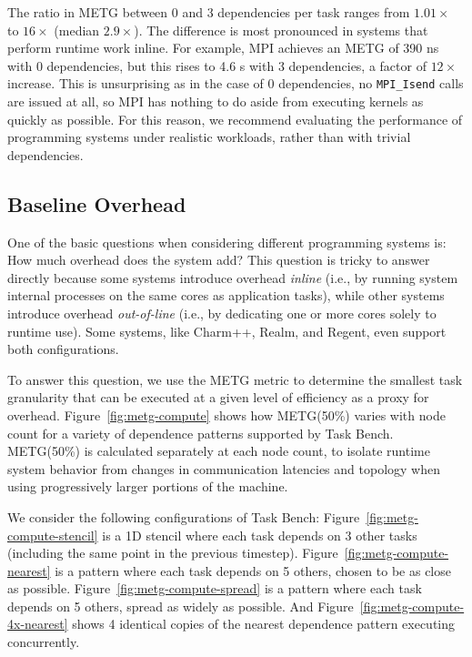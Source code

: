 

The ratio in METG between 0 and 3 dependencies per task ranges from
$1.01\times$ to $16\times$ (median $2.9\times$). The difference is most pronounced in systems that
perform runtime work inline. For example, MPI achieves an METG of 390
ns with 0 dependencies, but this rises to 4.6 \textmu{}s with 3 dependencies,
a factor of $12\times$ increase. This is unsurprising as in the case
of 0 dependencies, no \lstinline[language=C++]{MPI_Isend} calls are
issued at all, so MPI has nothing to do aside from executing kernels
as quickly as possible. For this reason, we recommend evaluating the performance of
programming systems under realistic workloads, rather than with
trivial dependencies.

\subsection{Baseline Overhead}



One of the basic questions when considering different programming
systems is: How much overhead does the system add? This question is tricky to answer directly because some systems introduce
overhead \emph{inline} (i.e., by running system internal processes on
the same cores as application tasks), while other systems introduce
overhead \emph{out-of-line} (i.e., by dedicating one or more cores
solely to runtime use). Some systems, like Charm++, Realm, and Regent,
even support both configurations.

To answer this question, we use the METG metric to determine the
smallest task granularity that can be executed at a given level of
efficiency as a proxy for overhead. Figure~\ref{fig:metg-compute}
shows how METG(50\%) varies with node count for a variety of
dependence patterns supported by Task Bench. METG(50\%) is calculated
separately at each node count, to isolate runtime system behavior from
changes in communication latencies and topology when using
progressively larger portions of the machine.

We consider the following configurations of Task Bench:
Figure~\ref{fig:metg-compute-stencil} is a 1D stencil where each task
depends on 3 other tasks (including the same point in the previous
timestep). Figure~\ref{fig:metg-compute-nearest} is a pattern where
each task depends on 5 others, chosen to be as close as
possible. Figure~\ref{fig:metg-compute-spread} is a pattern where each
task depends on 5 others, spread as widely as possible. And
Figure~\ref{fig:metg-compute-4x-nearest} shows 4 identical copies of
the nearest dependence pattern executing concurrently.

